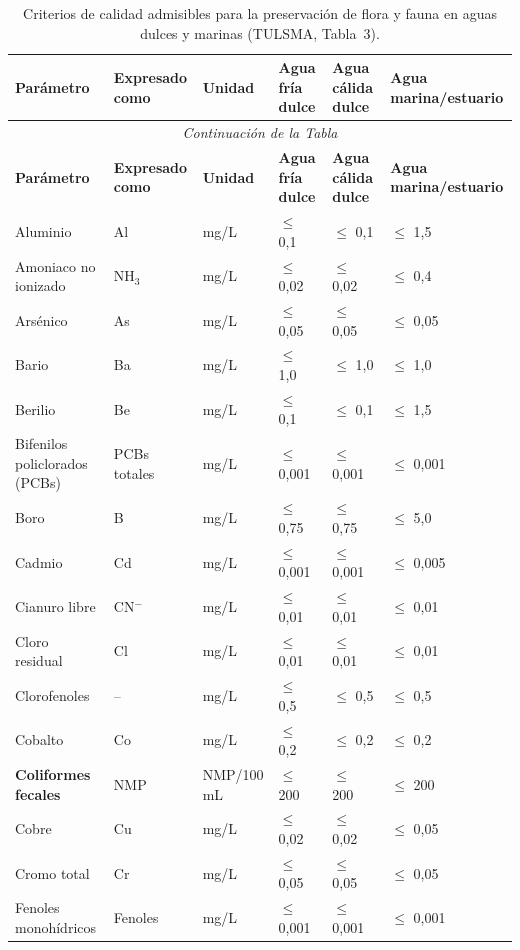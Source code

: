 \documentclass[12pt,a4paper]{article}
\begin{document}
\small
\begin{longtable}{p{4.0cm}p{1.8cm}p{1.2cm}p{2.5cm}p{2.5cm}p{2.5cm}}
\caption{Criterios de calidad admisibles para la preservaci\'on de flora y fauna en aguas dulces y marinas (TULSMA, Tabla~3).}\\
\toprule
\textbf{Par\'ametro} & \textbf{Expresado como} & \textbf{Unidad} & \textbf{Agua fr\'ia dulce} & \textbf{Agua c\'alida dulce} & \textbf{Agua marina/estuario} \\
\midrule
\endfirsthead
\multicolumn{6}{c}{\small\itshape Continuaci\'on de la Tabla}\\
\toprule
\textbf{Par\'ametro} & \textbf{Expresado como} & \textbf{Unidad} & \textbf{Agua fr\'ia dulce} & \textbf{Agua c\'alida dulce} & \textbf{Agua marina/estuario} \\
\midrule
\endhead
\bottomrule
\endlastfoot
Aluminio & Al & mg/L & $\leq$ 0,1 & $\leq$ 0,1 & $\leq$ 1,5 \\
Amoniaco no ionizado & NH$_3$ & mg/L & $\leq$ 0,02 & $\leq$ 0,02 & $\leq$ 0,4 \\
Ars\'enico & As & mg/L & $\leq$ 0,05 & $\leq$ 0,05 & $\leq$ 0,05 \\
Bario & Ba & mg/L & $\leq$ 1,0 & $\leq$ 1,0 & $\leq$ 1,0 \\
Berilio & Be & mg/L & $\leq$ 0,1 & $\leq$ 0,1 & $\leq$ 1,5 \\
Bifenilos policlorados (PCBs) & PCBs totales & mg/L & $\leq$ 0,001 & $\leq$ 0,001 & $\leq$ 0,001 \\
Boro & B & mg/L & $\leq$ 0,75 & $\leq$ 0,75 & $\leq$ 5,0 \\
Cadmio & Cd & mg/L & $\leq$ 0,001 & $\leq$ 0,001 & $\leq$ 0,005 \\
Cianuro libre & CN$^-$ & mg/L & $\leq$ 0,01 & $\leq$ 0,01 & $\leq$ 0,01 \\
Cloro residual & Cl & mg/L & $\leq$ 0,01 & $\leq$ 0,01 & $\leq$ 0,01 \\
Clorofenoles & -- & mg/L & $\leq$ 0,5 & $\leq$ 0,5 & $\leq$ 0,5 \\
Cobalto & Co & mg/L & $\leq$ 0,2 & $\leq$ 0,2 & $\leq$ 0,2 \\
\textbf{Coliformes fecales} & NMP & NMP/100 mL & $\leq$ 200 & $\leq$ 200 & $\leq$ 200 \\
Cobre & Cu & mg/L & $\leq$ 0,02 & $\leq$ 0,02 & $\leq$ 0,05 \\
Cromo total & Cr & mg/L & $\leq$ 0,05 & $\leq$ 0,05 & $\leq$ 0,05 \\
Fenoles monoh\'idricos & Fenoles & mg/L & $\leq$ 0,001 & $\leq$ 0,001 & $\leq$ 0,001 \\

\end{longtable}
\end{document}
